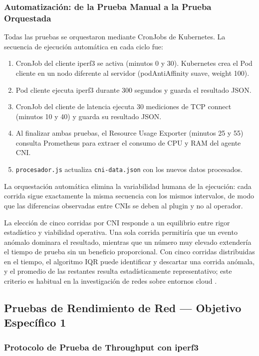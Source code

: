 \subsubsection{Automatización: de la Prueba Manual a la Prueba Orquestada}

Todas las pruebas se orquestaron mediante CronJobs de Kubernetes. La secuencia de ejecución automática en cada ciclo fue:
\begin{enumerate}
\item CronJob del cliente iperf3 se activa (minutos 0 y 30). Kubernetes crea el Pod cliente en un nodo diferente al servidor (podAntiAffinity suave, weight 100).
\item Pod cliente ejecuta iperf3 durante 300 segundos y guarda el resultado JSON.
\item CronJob del cliente de latencia ejecuta 30 mediciones de TCP connect (minutos 10 y 40) y guarda su resultado JSON.
\item Al finalizar ambas pruebas, el Resource Usage Exporter (minutos 25 y 55) consulta Prometheus para extraer el consumo de CPU y RAM del agente CNI.
\item \texttt{procesador.js} actualiza \texttt{cni-data.json} con los nuevos datos procesados.
\end{enumerate}

La orquestación automática elimina la variabilidad humana de la ejecución: cada corrida sigue exactamente la misma secuencia con los mismos intervalos, de modo que las diferencias observadas entre CNIs se deben al plugin y no al operador.

La elección de cinco corridas por CNI responde a un equilibrio entre rigor estadístico y viabilidad operativa. Una sola corrida permitiría que un evento anómalo dominara el resultado, mientras que un número muy elevado extendería el tiempo de prueba sin un beneficio proporcional. Con cinco corridas distribuidas en el tiempo, el algoritmo IQR puede identificar y descartar una corrida anómala, y el promedio de las restantes resulta estadísticamente representativo; este criterio es habitual en la investigación de redes sobre entornos cloud \cite{ref7,ref8}.

\subsection{Pruebas de Rendimiento de Red --- Objetivo Específico 1}

\subsubsection{Protocolo de Prueba de Throughput con iperf3}

